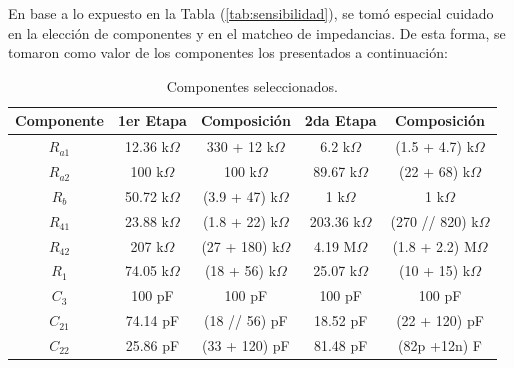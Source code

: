 En base a lo expuesto en la Tabla (\ref{tab:sensibilidad}), se tomó especial cuidado en la elección de componentes y en el matcheo de impedancias. De esta forma, se tomaron como valor de los componentes los presentados a continuación:
\begin{table}[H]
\centering
\begin{tabular}{ccccc}
\hline
\multicolumn{1}{c}{Componente} & \multicolumn{1}{c}{1er Etapa} & \multicolumn{1}{c}{Composición} & 2da Etapa        & Composición            \\ \hline
$R_{a1}$                          & 12.36 k$\Omega$               & 330 + 12 k$\Omega$                & 6.2 k$\Omega$    & (1.5 + 4.7) k$\Omega$   \\
$R_{a2}$                          & 100 k$\Omega$                 & 100 k$\Omega$                   & 89.67 k$\Omega$ & (22 + 68) k$\Omega$     \\
$R_b$                          & 50.72 k$\Omega$              & (3.9 + 47) k$\Omega$             & 1 k$\Omega$       & 1 k$\Omega$             \\
$R_{41}$                          & 23.88 k$\Omega$               & (1.8 + 22) k$\Omega$               & 203.36 k$\Omega$ & (270 // 820) k$\Omega$ \\
$R_{42}$                          & 207 k$\Omega$                 & (27 + 180) k$\Omega$             & 4.19 M$\Omega$   & (1.8 + 2.2) M$\Omega$   \\
$R_1$                          & 74.05 k$\Omega$               & (18 + 56) k$\Omega$              & 25.07 k$\Omega$  & (10 + 15) k$\Omega$       \\
$C_3$                          & 100 pF                        & 100 pF                          & 100 pF           & 100 pF                 \\
$C_{21}$                          & 74.14 pF                      & (18 // 56) pF                    & 18.52 pF         & (22 + 120) pF           \\
$C_{22}$                          & 25.86 pF                       & (33 + 120) pF                    & 81.48 pF          & (82p +12n) F         \\
\hline    
\end{tabular}
\caption{Componentes seleccionados.}
\label{tab:componentes}
\end{table}

